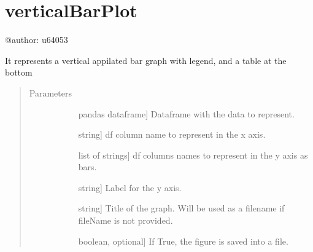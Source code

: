 \documentclass[letterpaper,10pt,english]{sphinxmanual}
\begin{document}
\chapter{verticalBarPlot}
\label{\detokenize{rstFiles/verticalBarPlot:module-verticalBarPlot}}\label{\detokenize{rstFiles/verticalBarPlot:verticalbarplot}}\label{\detokenize{rstFiles/verticalBarPlot::doc}}
@author: u64053

\begin{fulllineitems}
\label{\detokenize{rstFiles/verticalBarPlot:verticalBarPlot.vBarPlot}}
It represents a vertical appilated bar graph with legend,
and a table at the bottom
\begin{quote}\begin{description}
\item[{Parameters}] \leavevmode\begin{description}
\item[{}] \leavevmode{[}pandas dataframe{]}
Dataframe with the data to represent.

\item[{}] \leavevmode{[}string{]}
df column name to represent in the x axis.

\item[{}] \leavevmode{[}list of strings{]}
df columns names to represent in the y axis as bars.

\item[{}] \leavevmode{[}string{]}
Label for the y axis.

\item[{}] \leavevmode{[}string{]}
Title of the graph. 
Will be used as a filename if fileName is not provided.

\item[{}] \leavevmode{[}boolean, optional{]}
If True, the figure is saved into a file.

\end{description}


\end{description}
\end{quote}
\end{fulllineitems}
\end{document}
